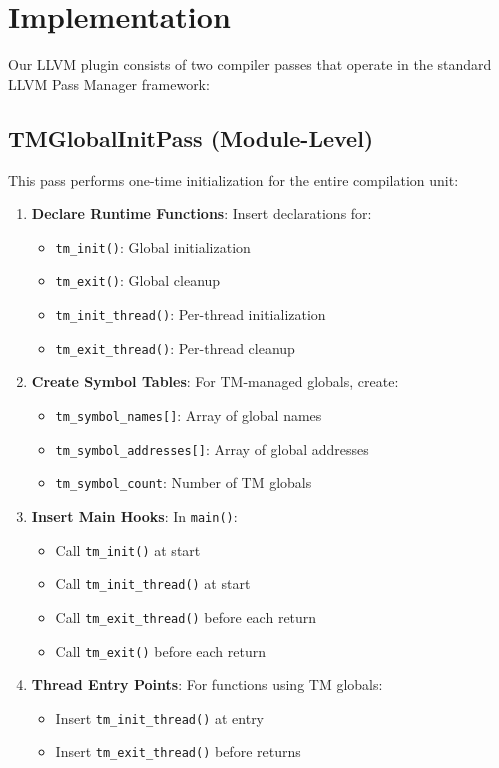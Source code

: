 \documentclass[article,12pt]{article}
\begin{document}
\section{Implementation}\label{sec:implementation}

Our LLVM plugin consists of two compiler passes that operate in the standard LLVM Pass Manager framework:

\subsection{TMGlobalInitPass (Module-Level)}

This pass performs one-time initialization for the entire compilation unit:

\begin{enumerate}
\item \textbf{Declare Runtime Functions}: Insert declarations for:
  \begin{itemize}
  \item \texttt{tm\_init()}: Global initialization
  \item \texttt{tm\_exit()}: Global cleanup
  \item \texttt{tm\_init\_thread()}: Per-thread initialization
  \item \texttt{tm\_exit\_thread()}: Per-thread cleanup
  \end{itemize}
\item \textbf{Create Symbol Tables}: For TM-managed globals, create:
  \begin{itemize}
  \item \texttt{tm\_symbol\_names[]}: Array of global names
  \item \texttt{tm\_symbol\_addresses[]}: Array of global addresses
  \item \texttt{tm\_symbol\_count}: Number of TM globals
  \end{itemize}
\item \textbf{Insert Main Hooks}: In \texttt{main()}:
  \begin{itemize}
  \item Call \texttt{tm\_init()} at start
  \item Call \texttt{tm\_init\_thread()} at start
  \item Call \texttt{tm\_exit\_thread()} before each return
  \item Call \texttt{tm\_exit()} before each return
  \end{itemize}
\item \textbf{Thread Entry Points}: For functions using TM globals:
  \begin{itemize}
  \item Insert \texttt{tm\_init\_thread()} at entry
  \item Insert \texttt{tm\_exit\_thread()} before returns
  \end{itemize}
\end{enumerate}
\end{document}
